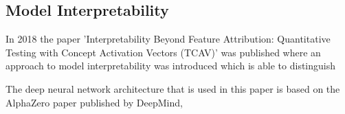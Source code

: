 \subsection{Model Interpretability}

In 2018 the paper 'Interpretability Beyond Feature Attribution: Quantitative Testing with Concept Activation Vectors (TCAV)'
was published where an approach to model interpretability was introduced which is able to
distinguish

The deep neural network architecture that is used in this paper is based on the AlphaZero paper
published by DeepMind,
